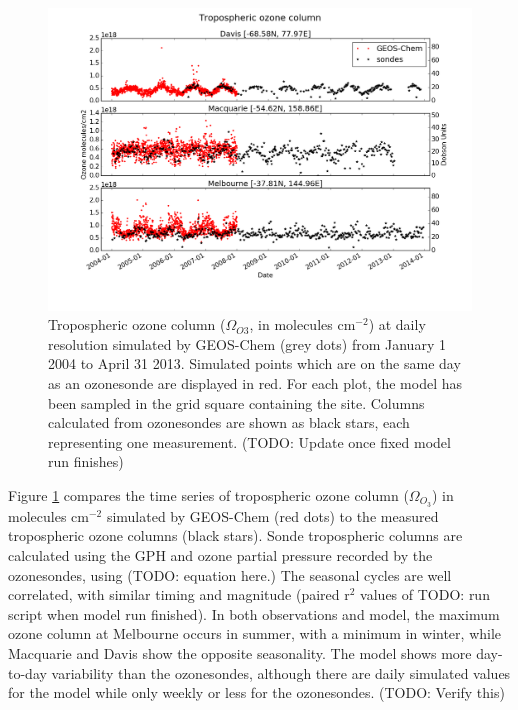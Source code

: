 \documentclass{article}
\begin{document}
  \begin{figure}[!htbp]
    \includegraphics[width=\textwidth]{figures/StationSeries.png}
    \caption{Tropospheric ozone column ($\Omega_{O3}$, in molecules cm$^{-2}$) at daily resolution simulated by GEOS-Chem (grey dots) from January 1 2004 to April 31 2013.
    Simulated points which are on the same day as an ozonesonde are displayed in red.
    For each plot, the model has been sampled in the grid square containing the site.
    Columns calculated from ozonesondes are shown as black stars, each representing one measurement. (TODO: Update once fixed model run finishes)}
    \label{fig:StationSeriesGEOSChem}
  \end{figure}
  
  Figure \ref{fig:StationSeriesGEOSChem} compares the time series of tropospheric ozone column ($\Omega_{O_3}$) in molecules cm$^{-2}$ simulated by GEOS-Chem (red dots) to the measured tropospheric ozone columns (black stars).
  Sonde tropospheric columns are calculated using the GPH and ozone partial pressure recorded by the ozonesondes, using (TODO: equation here.)
  The seasonal cycles are well correlated, with similar timing and magnitude (paired r$^2$ values of TODO: run script when model run finished). 
  In both observations and model, the maximum ozone column at Melbourne occurs in summer, with a minimum in winter, while Macquarie and Davis show the opposite seasonality.
  The model shows more day-to-day variability than the ozonesondes, although there are daily simulated values for the model while only weekly or less for the ozonesondes. (TODO: Verify this)
  
\end{document}
